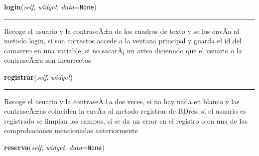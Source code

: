 \hspace{.8\funcindent}\begin{boxedminipage}{\funcwidth}

    \raggedright \textbf{login}(\textit{self}, \textit{widget}, \textit{data}={\tt None})

    \vspace{-1.5ex}

    \rule{\textwidth}{0.5\fboxrule}
\setlength{\parskip}{2ex}
    Recoge el usuario y la contraseÃ±a de los cuadros de texto y se los 
    envÃ­a al metodo login, si son correctos accede a la ventana principal 
    y guarda el id del camarero en una variable, si no sacarÃ¡ un aviso 
    dicienndo que el usuario o la contraseÃ±a son incorrectos

\setlength{\parskip}{1ex}
    \end{boxedminipage}

    \label{main:Main:Restaurante:registrar}

    \vspace{0.5ex}

\hspace{.8\funcindent}\begin{boxedminipage}{\funcwidth}

    \raggedright \textbf{registrar}(\textit{self}, \textit{widget})

    \vspace{-1.5ex}

    \rule{\textwidth}{0.5\fboxrule}
\setlength{\parskip}{2ex}
    Recoge el usuario y la contraseÃ±a dos veces, si no hay nada en blanco 
    y las contraseÃ±as coinciden la envÃ­a al metodo registrar de BDres, si
    el usuario es registrado se limpian los campos, si se da un error en el
    registro o en una de las comprobaciones mencionadas anteriormente

\setlength{\parskip}{1ex}
    \end{boxedminipage}

    \label{main:Main:Restaurante:reserva}

    \vspace{0.5ex}

\hspace{.8\funcindent}\begin{boxedminipage}{\funcwidth}

    \raggedright \textbf{reserva}(\textit{self}, \textit{widget}, \textit{data}={\tt None})

\setlength{\parskip}{2ex}
\setlength{\parskip}{1ex}
    \end{boxedminipage}

